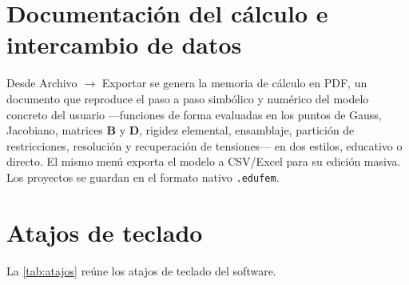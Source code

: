 \section{Documentación del cálculo e intercambio de datos}

Desde \textsf{Archivo} $\rightarrow$ \textsf{Exportar} se genera la memoria de cálculo en PDF, un documento que reproduce el paso a paso simbólico y numérico del modelo concreto del usuario ---funciones de forma evaluadas en los puntos de Gauss, Jacobiano, matrices $\bm{B}$ y $\bm{D}$, rigidez elemental, ensamblaje, partición de restricciones, resolución y recuperación de tensiones--- en dos estilos, educativo o directo. El mismo menú exporta el modelo a CSV/Excel para su edición masiva. Los proyectos se guardan en el formato nativo \texttt{.edufem}.

\section{Atajos de teclado}

La \autoref{tab:atajos} reúne los atajos de teclado del software.

